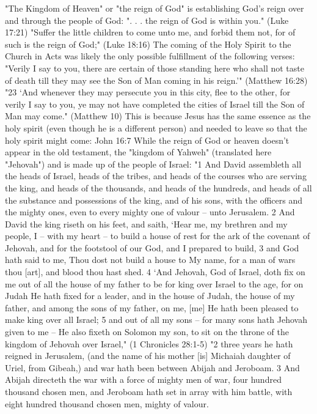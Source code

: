 \documentclass[11pt]{article}
\begin{document}
\begin{thebibliography}{37}
"The Kingdom of Heaven" or "the reign of God" is establishing God's reign over and through the people of God:  ". . .   the reign of God is within you." (Luke 17:21) "Suffer the little children to come unto me, and forbid them not, for of such is the reign of God;" (Luke 18:16) The coming of the Holy Spirit to the Church in Acts was likely the only possible fulfillment of the following verses:
"Verily I say to you, there are certain of those standing here who shall not taste of death till they may see the Son of Man coming in his reign.'" (Matthew 16:28)
"23 `And whenever they may persecute you in this city, flee to the other, for verily I say to you, ye may not have completed the cities of Israel till the Son of Man may come." (Matthew 10)
This is because Jesus has the same essence as the holy spirit (even though he is a different person) and needed to leave so that the holy spirit might come: John 16:7
While the reign of God or heaven doesn't appear in the old testament, the "kingdom of Yahweh" (translated here "Jehovah") and is made up of the people of Israel:  "1 And David assembleth all the heads of Israel, heads of the tribes, and heads of the courses who are serving the king, and heads of the thousands, and heads of the hundreds, and heads of all the substance and possessions of the king, and of his sons, with the officers and the mighty ones, even to every mighty one of valour -- unto Jerusalem.
2 And David the king riseth on his feet, and saith, `Hear me, my brethren and my people, I -- with my heart -- to build a house of rest for the ark of the covenant of Jehovah, and for the footstool of our God, and I prepared to build,
3 and God hath said to me, Thou dost not build a house to My name, for a man of wars thou [art], and blood thou hast shed.
4 `And Jehovah, God of Israel, doth fix on me out of all the house of my father to be for king over Israel to the age, for on Judah He hath fixed for a leader, and in the house of Judah, the house of my father, and among the sons of my father, on me, [me] He hath been pleased to make king over all Israel;
5 and out of all my sons -- for many sons hath Jehovah given to me -- He also fixeth on Solomon my son, to sit on the throne of the kingdom of Jehovah over Israel," (1 Chronicles 28:1-5) \newline
"2 three years he hath reigned in Jerusalem, (and the name of his mother [is] Michaiah daughter of Uriel, from Gibeah,) and war hath been between Abijah and Jeroboam.
3 And Abijah directeth the war with a force of mighty men of war, four hundred thousand chosen men, and Jeroboam hath set in array with him battle, with eight hundred thousand chosen men, mighty of valour.

\end{thebibliography}
\end{document}
